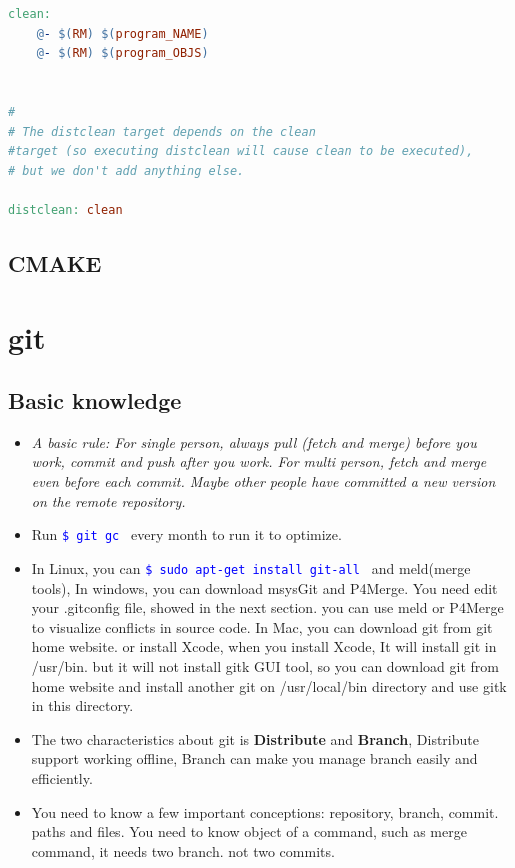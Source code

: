 \documentclass[a4paper,12pt,twoside]{book}
\newcommand{\linuxcommand}[1]{\texttt{\textcolor{blue}{\$ #1 \Pisymbol{psy}{191}}}}
\begin{document}
\begin{itemize}
\begin{itemize}
\begin{itemize}
\begin{lstlisting}[frame=single,  basicstyle=\small, language=make]
clean:
    @- $(RM) $(program_NAME)
    @- $(RM) $(program_OBJS)


#
# The distclean target depends on the clean
#target (so executing distclean will cause clean to be executed), 
# but we don't add anything else.

distclean: clean
\end{lstlisting}


\end{itemize}

\subsection{CMAKE}


\section{git}

\subsection{Basic knowledge}
\begin{itemize}
\item \emph{A basic rule:  For single person, always pull (fetch and merge) before you work,  commit and push after you work.  For multi person, fetch and merge even before each commit.  Maybe other people have committed a new version on the remote repository. }

 \item Run \linuxcommand{git gc} every month to run it to optimize.

 \item In Linux, you can \linuxcommand{sudo apt-get install git-all} and meld(merge tools), In windows, you can download msysGit and P4Merge. You need edit your .gitconfig file, showed in the next section. you can use meld or P4Merge to visualize conflicts in source code. In Mac, you can download git from git home website. or install Xcode, when you install Xcode, It will install git in /usr/bin. but it will not install gitk GUI tool, so you can download git from home website and install another git on /usr/local/bin directory and use gitk in this directory. 

\item The two characteristics about git is \textbf{Distribute} and \textbf{Branch}, Distribute support working offline, Branch can make you manage branch easily and efficiently.

\item You need to know a few important conceptions: repository, branch, commit.  paths and files. You need to know object of a command, such as merge command, it needs two branch. not two commits. 
   

\end{itemize}
\end{itemize}
\end{itemize}
\end{document}
